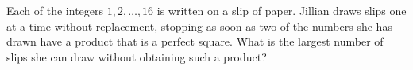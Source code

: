 Each of the integers $1,2,\dots,16$ is written on a slip of paper. Jillian draws slips one at a time without replacement, stopping as soon as two of the numbers she has drawn have a product that is a perfect square. What is the largest number of slips she can draw without obtaining such a product?
